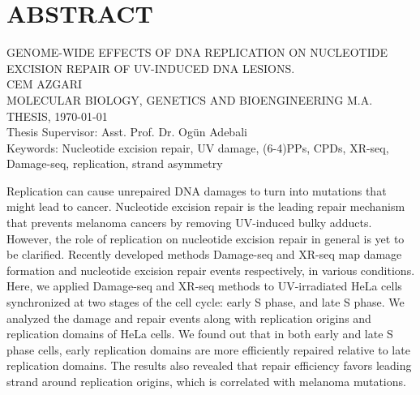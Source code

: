 \setcounter{page}{3}
\chapter*{\vspace{-4\baselineskip} \bf ABSTRACT} 

\begin{center}
\MakeUppercase{GENOME-WIDE EFFECTS OF DNA REPLICATION ON
NUCLEOTIDE EXCISION REPAIR OF UV-INDUCED
DNA LESIONS.} \\[3\baselineskip]
\MakeUppercase{Cem Azgari} \\[\baselineskip]
MOLECULAR BIOLOGY, GENETICS AND BIOENGINEERING M.A. THESIS, \Cemdateformat\today \\[\baselineskip]
Thesis Supervisor: Asst. Prof. Dr. Ogün Adebali \\[2\baselineskip]
Keywords: Nucleotide excision repair, UV damage, (6-4)PPs, CPDs, XR-seq, Damage-seq,
replication, strand asymmetry \\[2\baselineskip]
\end{center}

\singlespacing
Replication can cause unrepaired DNA damages to turn into mutations that might lead to cancer. Nucleotide excision repair is the leading repair mechanism that prevents melanoma cancers by removing UV-induced bulky adducts. However, the role of replication on nucleotide excision repair in general is yet to be clarified. Recently developed methods Damage-seq and XR-seq map damage formation and nucleotide excision repair events respectively, in various conditions. Here, we applied Damage-seq and XR-seq methods to UV-irradiated HeLa cells synchronized at two stages of the cell cycle: early S phase, and late S phase. We analyzed the damage and repair events along with replication origins and replication domains of HeLa cells. We found out that in both early and late S phase cells, early replication domains are more efficiently repaired relative to late replication domains. The results also revealed that repair efficiency favors leading strand around replication origins, which is correlated with melanoma mutations.

\clearpage\pagebreak
\onehalfspacing
